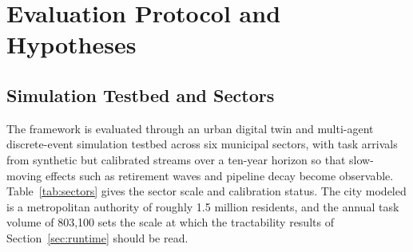 
	\section{Evaluation Protocol and Hypotheses}
	\label{sec:expsetup}
	
	\subsection{Simulation Testbed and Sectors}
	\label{sec:testbed}
	
	The framework is evaluated through an urban digital twin and multi-agent discrete-event simulation testbed across six municipal sectors, with task arrivals from synthetic but calibrated streams over a ten-year horizon so that slow-moving effects such as retirement waves and pipeline decay become observable. Table~\ref{tab:sectors} gives the sector scale and calibration status. The city modeled is a metropolitan authority of roughly 1.5 million residents, and the annual task volume of 803{,}100 sets the scale at which the tractability results of Section~\ref{sec:runtime} should be read.
	
